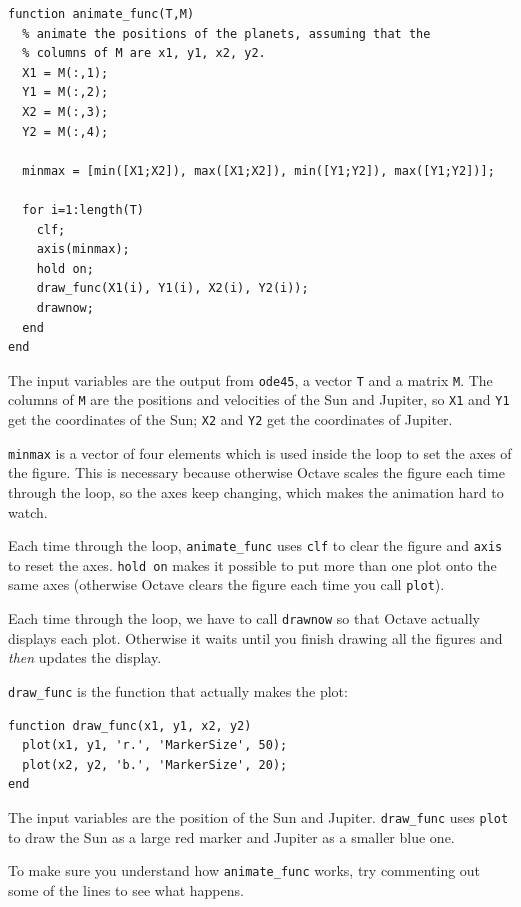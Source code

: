 \documentclass{book}
\begin{document}
\begin{verbatim}
function animate_func(T,M)
  % animate the positions of the planets, assuming that the
  % columns of M are x1, y1, x2, y2.
  X1 = M(:,1);
  Y1 = M(:,2);
  X2 = M(:,3);
  Y2 = M(:,4);

  minmax = [min([X1;X2]), max([X1;X2]), min([Y1;Y2]), max([Y1;Y2])];

  for i=1:length(T)
    clf;
    axis(minmax);
    hold on;
    draw_func(X1(i), Y1(i), X2(i), Y2(i));
    drawnow;
  end
end
\end{verbatim}

The input variables are the output from {\tt ode45}, a vector
{\tt T} and a matrix {\tt M}. The columns of {\tt M} are the
positions and velocities of the Sun and Jupiter, so
{\tt X1} and {\tt Y1} get the coordinates of the Sun;
{\tt X2} and {\tt Y2} get the coordinates of Jupiter.

{\tt minmax} is a vector of four elements which is used inside
the loop to set the axes of the figure. This is necessary because
otherwise Octave scales the figure each time through the loop,
so the axes keep changing, which makes the animation hard
to watch.

Each time through the loop, {\tt animate\_func} uses {\tt clf}
to clear the figure and {\tt axis} to reset the axes. {\tt hold
on} makes it possible to put more than one plot onto the same
axes (otherwise Octave clears the figure each time you call
{\tt plot}).

Each time through the loop, we have to call {\tt drawnow} so
that Octave actually displays each plot. Otherwise it waits
until you finish drawing all the figures and {\em then} updates
the display.

{\tt draw\_func} is the function that actually makes the
plot:

\begin{verbatim}
function draw_func(x1, y1, x2, y2)
  plot(x1, y1, 'r.', 'MarkerSize', 50);
  plot(x2, y2, 'b.', 'MarkerSize', 20);
end
\end{verbatim}

The input variables are the position of the Sun and Jupiter.
{\tt draw\_func} uses {\tt plot} to draw
the Sun as a large red marker and Jupiter as a smaller blue one.

\begin{ex}
To make sure you understand how {\tt animate\_func} works,
try commenting out some of the lines to see what happens.
\end{ex}
\end{document}
